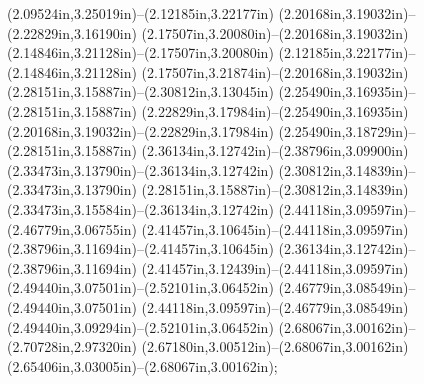 (2.09524in,3.25019in)--(2.12185in,3.22177in) (2.20168in,3.19032in)--(2.22829in,3.16190in) (2.17507in,3.20080in)--(2.20168in,3.19032in) (2.14846in,3.21128in)--(2.17507in,3.20080in) (2.12185in,3.22177in)--(2.14846in,3.21128in) (2.17507in,3.21874in)--(2.20168in,3.19032in) (2.28151in,3.15887in)--(2.30812in,3.13045in) (2.25490in,3.16935in)--(2.28151in,3.15887in) (2.22829in,3.17984in)--(2.25490in,3.16935in) (2.20168in,3.19032in)--(2.22829in,3.17984in) (2.25490in,3.18729in)--(2.28151in,3.15887in) (2.36134in,3.12742in)--(2.38796in,3.09900in) (2.33473in,3.13790in)--(2.36134in,3.12742in) (2.30812in,3.14839in)--(2.33473in,3.13790in) (2.28151in,3.15887in)--(2.30812in,3.14839in) (2.33473in,3.15584in)--(2.36134in,3.12742in) (2.44118in,3.09597in)--(2.46779in,3.06755in) (2.41457in,3.10645in)--(2.44118in,3.09597in) (2.38796in,3.11694in)--(2.41457in,3.10645in) (2.36134in,3.12742in)--(2.38796in,3.11694in) (2.41457in,3.12439in)--(2.44118in,3.09597in) (2.49440in,3.07501in)--(2.52101in,3.06452in) (2.46779in,3.08549in)--(2.49440in,3.07501in) (2.44118in,3.09597in)--(2.46779in,3.08549in) (2.49440in,3.09294in)--(2.52101in,3.06452in) (2.68067in,3.00162in)--(2.70728in,2.97320in) (2.67180in,3.00512in)--(2.68067in,3.00162in) (2.65406in,3.03005in)--(2.68067in,3.00162in);
